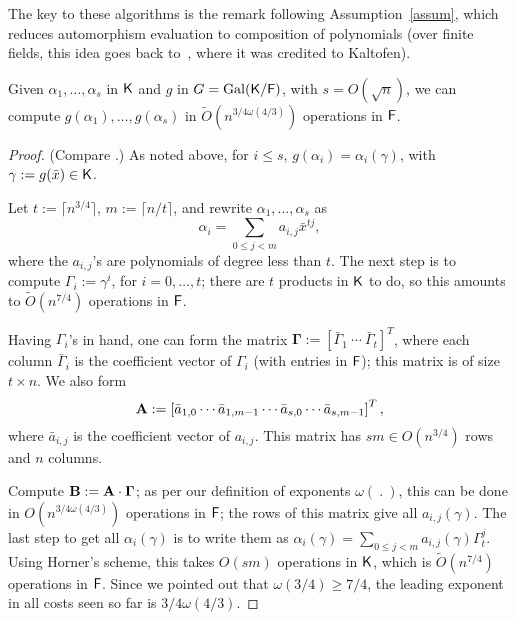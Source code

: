 The key to these algorithms is the remark following
Assumption~\ref{assum}, which reduces automorphism evaluation to
composition of polynomials (over finite fields, this idea goes back
to~\cite{GaSh92}, where it was credited to Kaltofen).

\begin{lemma}\label{lem:modcom}
  Given $\alpha_1,\dots,\alpha_s$ in ${\mathsf{K}}$ and $g$ in $G =
  \mathrm{Gal}({\mathsf{K}}/{\mathsf{F}})$, with $s = O(\sqrt{n})$, we can compute
  $g(\alpha_1),\dots,g(\alpha_s)$ in $\tilde
  O(n^{{3}/{4}\omega({4}/{3})})$ operations in ${\mathsf{F}}$.
\end{lemma}
\begin{proof}
(Compare \cite[Lemma~3]{Kaltofen}.) As noted above, for $i\le s$,
  $g(\alpha_i) = \alpha_i(\gamma)$, with $\gamma := g(\bar x) \in {\mathsf{K}}$.

  Let $t := \lceil n^{3/4} \rceil$, $m:=\lceil n/t\rceil$, and rewrite $\alpha_1 , \ldots , \alpha_s$ as 
$$\alpha_i = \sum_{0 \leq j < m} a_{i,j}\bar x^{tj},$$ where the
  $a_{i,j}$'s are polynomials of degree less than $t$. The next step
  is to compute $\Gamma_i := \gamma^i$, for $i = 0 , \ldots , t$;
  there are $t$ products in ${\mathsf{K}}$ to do, so this amounts to
  $\tilde{O}(n^{7/4})$ operations in ${\mathsf{F}}$.

  Having $\Gamma_i$'s in hand, one can form the matrix $\boldsymbol{\Gamma} :=
  \left[ \bar \Gamma_1 ~ \cdots ~\bar \Gamma_t \right]^T$, where each column 
$\bar \Gamma_i$ is
  the coefficient vector of $\Gamma_i$ (with entries in ${\mathsf{F}}$);
  this matrix is of size $t \times n$. We also form
  $$\mat A := \left[\bar{a}_{1,0} \cdots \bar{a}_{1,m-1} \cdots
    \bar{a}_{s,0} \cdots \bar{a}_{s,m-1}\right]^T,$$ where
  $\bar{a}_{i,j}$ is the coefficient vector of $a_{i,j}$. This matrix 
  has $s m \in O(n^{3/4})$ rows and $n$ columns.

  Compute $\mat B:=\mat A \cdot \boldsymbol{\Gamma}$; as per our
  definition of exponents $\omega(\ .\ )$, this can be done in
  $O(n^{3/4 \omega(4/3)})$ operations in ${\mathsf{F}}$; the rows of this matrix
  give all $a_{i,j}(\gamma)$.  The last step to get all
  $\alpha_i(\gamma)$ is to write them as $\alpha_i(\gamma) = \sum_{0
    \leq j < m} a_{i,j}(\gamma) \Gamma_t^{j}.$ Using Horner's scheme,
  this takes $O(sm)$ operations in ${\mathsf{K}}$, which is $\tilde{O}(n^{7/4})$
  operations in ${\mathsf{F}}$. Since we pointed out that $\omega(3/4) \ge 7/4$,
  the leading exponent in all costs seen so far is
  ${3}/{4}\omega({4}/{3})$.
\end{proof}

